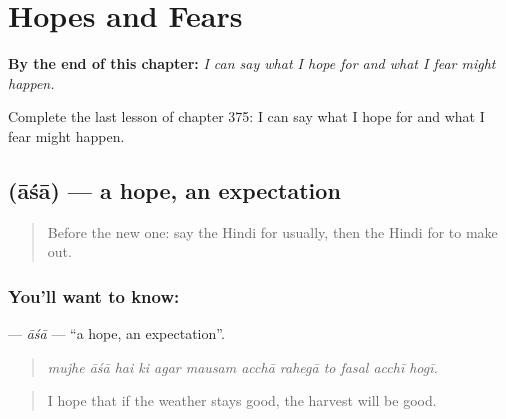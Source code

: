 
\chapter{Hopes and Fears}
\label{ch:hi-hopes-and-fears}

\begin{chapteropening}
\textbf{By the end of this chapter:} \emph{I can say what I hope for and what I fear might happen.}

Complete the last lesson of chapter 375: I can say what I hope for and what I fear might happen.
\end{chapteropening}

\section[\texorpdfstring{\hi{आशा} (āśā)}{आशा (āśā)}]{ (āśā) — a hope, an expectation}

\label{lesson:HI-C375-asa}



\begin{quote}
Before the new one: say the Hindi for usually, then the Hindi for to make out.
\end{quote}

\subsection*{You'll want to know: }
\textbf{} — \emph{āśā} — \textquotedblleft{}a hope, an expectation\textquotedblright{}.

\begin{quote}
           
\end{quote}

\begin{quote}
\emph{mujhe āśā hai ki agar mausam acchā rahegā to fasal acchī hogī.}
\end{quote}

\begin{quote}
I hope that if the weather stays good, the harvest will be good.
\end{quote}

